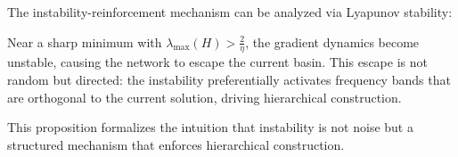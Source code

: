 The instability-reinforcement mechanism can be analyzed via Lyapunov stability:

\begin{proposition}
\label{prop:instability-escape}
Near a sharp minimum with $\lambda_{\max}(H) > \frac{2}{\eta}$, the gradient dynamics become unstable, causing the network to escape the current basin. This escape is not random but directed: the instability preferentially activates frequency bands that are orthogonal to the current solution, driving hierarchical construction.
\end{proposition}

This proposition formalizes the intuition that instability is not noise but a structured mechanism that enforces hierarchical construction.

